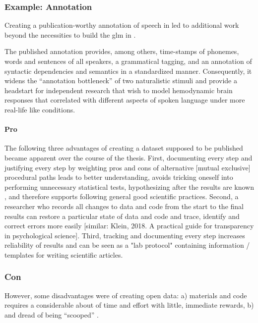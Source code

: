 \subsubsection{Example: Annotation}


Creating a publication-worthy annotation of speech in
\citep{haeusler2021speechanno} led to additional work beyond the necessities to build the \ac{glm} in \citep{haeusler2022processing}.

The published annotation provides, among others, time-stamps of phonemes, words
and sentences of all speakers, a grammatical tagging, and an annotation of
syntactic dependencies and semantics in a standardized manner.
%
Consequently, it widens the ``annotation bottleneck''
\citep{aliko2020naturalistic} of two naturalistic stimuli and provide a
headstart for independent research that wish to model hemodynamic brain
responses that correlated with different aspects of spoken language under more
real-life like conditions.


\paragraph{Pro}


The following three advantages of creating a dataset supposed to be published
became apparent over the course of the thesis.
%
First, documenting every step and justifying every step by weighting pros and
cons of alternative [mutual exclusive] procedural paths leads to better
understanding, avoids tricking oneself into performing unnecessary statistical
tests, hypothesizing after the results are known \citep[a.k.a. ``HARKing'';
cf.][]{kerr1998harking}, and therefore supports following general good
scientific practices.
%
Second, a researcher who records all changes to data and code from the start to
the final results can restore a particular state of data and code and trace,
identify and correct errors more easily [similar: Klein, 2018. A practical guide
for transparency in psychological science].
%
Third, tracking and documenting every step increases reliability of results and
can be seen as a "lab protocol" containing information / templates for writing
scientific articles.


\subsubsection{Con}
%
However, some disadvantages were of creating open data:
%
a) materials and code requires a considerable about of time and effort with
little, immediate rewards, b) and dread of being ``scooped''
\citep[cf.][]{laine2017afraid}.

